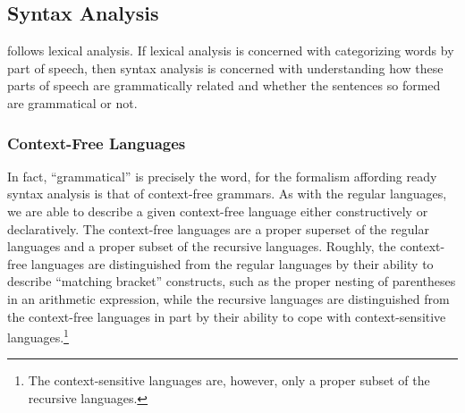\subsection{Syntax Analysis}
 follows lexical analysis. If lexical analysis is concerned with categorizing words by part of speech, then syntax analysis is concerned with understanding how these parts of speech are grammatically related and whether the sentences so formed are grammatical or not.

\subsubsection{Context-Free Languages}
In fact, ``grammatical'' is precisely the word, for the formalism affording ready syntax analysis is that of context-free grammars. As with the regular languages, we are able to describe a given context-free language either constructively or declaratively. The context-free languages are a proper superset of the regular languages and a proper subset of the recursive languages. Roughly, the context-free languages are distinguished from the regular languages by their ability to describe ``matching bracket'' constructs, such as the proper nesting of parentheses in an arithmetic expression, while the recursive languages are distinguished from the context-free languages in part by their ability to cope with context-sensitive languages.\footnote{The context-sensitive languages are, however, only a proper subset of the recursive languages.}

